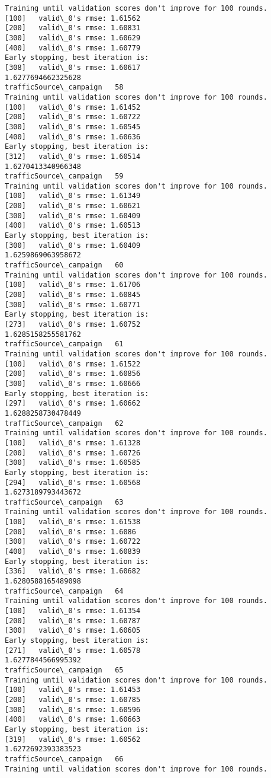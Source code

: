 \documentclass[11pt]{article}
\begin{document}
\begin{Verbatim}[commandchars=\\\{\}]
Training until validation scores don't improve for 100 rounds.
[100]	valid\_0's rmse: 1.61562
[200]	valid\_0's rmse: 1.60831
[300]	valid\_0's rmse: 1.60629
[400]	valid\_0's rmse: 1.60779
Early stopping, best iteration is:
[308]	valid\_0's rmse: 1.60617
1.6277694662325628
trafficSource\_campaign   58
Training until validation scores don't improve for 100 rounds.
[100]	valid\_0's rmse: 1.61452
[200]	valid\_0's rmse: 1.60722
[300]	valid\_0's rmse: 1.60545
[400]	valid\_0's rmse: 1.60636
Early stopping, best iteration is:
[312]	valid\_0's rmse: 1.60514
1.6270413340966348
trafficSource\_campaign   59
Training until validation scores don't improve for 100 rounds.
[100]	valid\_0's rmse: 1.61349
[200]	valid\_0's rmse: 1.60621
[300]	valid\_0's rmse: 1.60409
[400]	valid\_0's rmse: 1.60513
Early stopping, best iteration is:
[300]	valid\_0's rmse: 1.60409
1.6259869063958672
trafficSource\_campaign   60
Training until validation scores don't improve for 100 rounds.
[100]	valid\_0's rmse: 1.61706
[200]	valid\_0's rmse: 1.60845
[300]	valid\_0's rmse: 1.60771
Early stopping, best iteration is:
[273]	valid\_0's rmse: 1.60752
1.6285158255581762
trafficSource\_campaign   61
Training until validation scores don't improve for 100 rounds.
[100]	valid\_0's rmse: 1.61522
[200]	valid\_0's rmse: 1.60856
[300]	valid\_0's rmse: 1.60666
Early stopping, best iteration is:
[297]	valid\_0's rmse: 1.60662
1.6288258730478449
trafficSource\_campaign   62
Training until validation scores don't improve for 100 rounds.
[100]	valid\_0's rmse: 1.61328
[200]	valid\_0's rmse: 1.60726
[300]	valid\_0's rmse: 1.60585
Early stopping, best iteration is:
[294]	valid\_0's rmse: 1.60568
1.6273189793443672
trafficSource\_campaign   63
Training until validation scores don't improve for 100 rounds.
[100]	valid\_0's rmse: 1.61538
[200]	valid\_0's rmse: 1.6086
[300]	valid\_0's rmse: 1.60722
[400]	valid\_0's rmse: 1.60839
Early stopping, best iteration is:
[336]	valid\_0's rmse: 1.60682
1.6280588165489098
trafficSource\_campaign   64
Training until validation scores don't improve for 100 rounds.
[100]	valid\_0's rmse: 1.61354
[200]	valid\_0's rmse: 1.60787
[300]	valid\_0's rmse: 1.60605
Early stopping, best iteration is:
[271]	valid\_0's rmse: 1.60578
1.6277844566995392
trafficSource\_campaign   65
Training until validation scores don't improve for 100 rounds.
[100]	valid\_0's rmse: 1.61453
[200]	valid\_0's rmse: 1.60785
[300]	valid\_0's rmse: 1.60596
[400]	valid\_0's rmse: 1.60663
Early stopping, best iteration is:
[319]	valid\_0's rmse: 1.60562
1.6272692393383523
trafficSource\_campaign   66
Training until validation scores don't improve for 100 rounds.

\end{Verbatim}
\end{document}
